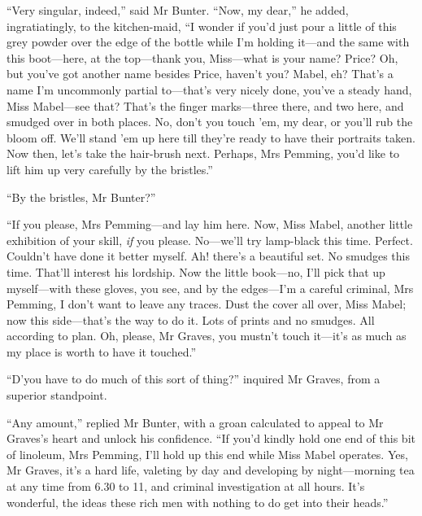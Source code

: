 \enquote{Very singular, indeed,} said Mr Bunter. \enquote{Now, my dear,} he added, ingratiatingly, to the kitchen-maid, \enquote{I wonder if you’d just pour a little of this grey powder over the edge of the bottle while I’m holding it\allowbreak---\allowbreak and the same with this boot\allowbreak---\allowbreak here, at the top\allowbreak---\allowbreak thank you, Miss\allowbreak---\allowbreak what is your name? Price? Oh, but you’ve got another name besides Price, haven’t you? Mabel, eh? That’s a name I’m uncommonly partial to\allowbreak---\allowbreak that’s very nicely done, you’ve a steady hand, Miss Mabel\allowbreak---\allowbreak see that? That’s the finger marks\allowbreak---\allowbreak three there, and two here, and smudged over in both places. No, don’t you touch ’em, my dear, or you’ll rub the bloom off. We’ll stand ’em up here till they’re ready to have their portraits taken. Now then, let’s take the hair-brush next. Perhaps, Mrs Pemming, you’d like to lift him up very carefully by the bristles.}

\enquote{By the bristles, Mr Bunter?}

\enquote{If you please, Mrs Pemming\allowbreak---\allowbreak and lay him here. Now, Miss Mabel, another little exhibition of your skill, \textit{if} you please. No\allowbreak---\allowbreak we’ll try lamp-black this time. Perfect. Couldn’t have done it better myself. Ah! there’s a beautiful set. No smudges this time. That’ll interest his lordship. Now the little book\allowbreak---\allowbreak no, I’ll pick that up myself\allowbreak---\allowbreak with these gloves, you see, and by the edges\allowbreak---\allowbreak I’m a careful criminal, Mrs Pemming, I don’t want to leave any traces. Dust the cover all over, Miss Mabel; now this side\allowbreak---\allowbreak that’s the way to do it. Lots of prints and no smudges. All according to plan. Oh, please, Mr Graves, you mustn’t touch it\allowbreak---\allowbreak it’s as much as my place is worth to have it touched.}

\enquote{D’you have to do much of this sort of thing?} inquired Mr Graves, from a superior standpoint.

\enquote{Any amount,} replied Mr Bunter, with a groan calculated to appeal to Mr Graves’s heart and unlock his confidence. \enquote{If you’d kindly hold one end of this bit of linoleum, Mrs Pemming, I’ll hold up this end while Miss Mabel operates. Yes, Mr Graves, it’s a hard life, valeting by day and developing by night\allowbreak---\allowbreak morning tea at any time from 6.30 to 11, and criminal investigation at all hours. It’s wonderful, the ideas these rich men with nothing to do get into their heads.}

